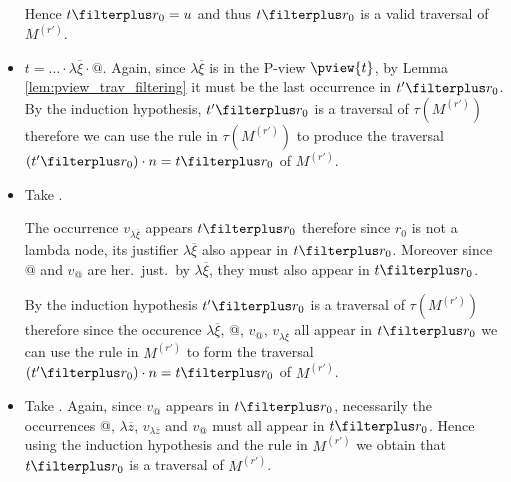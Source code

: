 \begin{itemize}
        Hence $t \filterplus r_0 = u$ and thus $t \filterplus r_0$ is a valid traversal of $M^{(r')}$.

    \item {} $t = \ldots \cdot \lambda \overline{\xi} \cdot @$.
        Again, since $\lambda \overline{\xi}$ is in the P-view
        $\pview{t}$, by Lemma \ref{lem:pview_trav_filtering} it must
        be the last occurrence in $t'\filterplus r_0$. By the
        induction hypothesis, $t' \filterplus r_0$ is a traversal of
        $\tau(M^{(r')})$ therefore we can use the rule
         in $\tau(M^{(r')})$ to produce the traversal
        $(t'\filterplus r_0) \cdot n = t \filterplus r_0$ of
        $M^{(r')}$.


    \item {} Take .

        The occurrence $v_{\lambda \overline{\xi}}$ appears
        $t\filterplus r_0$ therefore since $r_0$ is not a lambda
        node, its justifier $\lambda \overline{\xi}$ also appear in
        $t\filterplus r_0$. Moreover since $@$ and $v_@$ are her.\
        just.\ by $\lambda \overline{\xi}$, they must also appear in
        $t\filterplus r_0$.

        By the induction hypothesis $t' \filterplus r_0$ is a
        traversal of $\tau(M^{(r')})$ therefore since the occurence
        $\lambda \overline{\xi}$, @, $v_@$, $v_{\lambda
        \overline{\xi}}$ all appear in $t\filterplus r_0$ we can use
        the rule \rulenamet{Value$^{@\mapsto\lambda}$} in $M^{(r')}$
        to form the traversal $(t'\filterplus r_0) \cdot n = t
        \filterplus r_0$ of $M^{(r')}$.

    \item {}
          Take . Again, since $v_@$ appears in $t
        \filterplus r_0$, necessarily the occurrences @, $\lambda
        \overline{z}$, $v_{\lambda \overline{z}}$ and $v_@$ must all
        appear in $t \filterplus r_0$. Hence using the induction
        hypothesis and the rule
         in $M^{(r')}$ we
        obtain that $t \filterplus r_0$ is a traversal of
        $M^{(r')}$.


\end{itemize}
